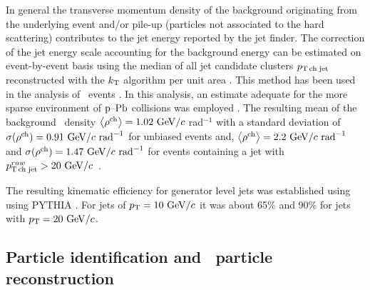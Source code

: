 In general the transverse momentum density of the background originating from the underlying event and/or pile-up (particles not associated to the hard scattering) contributes to the jet energy reported by the jet finder. 
The correction of the jet energy scale accounting for the background energy can be estimated on event-by-event basis using the median of all jet candidate clusters $p_\mathrm{T\,ch\;jet}$ reconstructed with the $k_{\textnormal{T}}$ algorithm per unit area \cite{Cacciari:2008gn}. 
This method has been used in the analysis of \PbPb\ events \cite{Abelev:2013kqa,Adam:2015ewa}.
In this analysis, an estimate adequate for the more sparse environment of $\mbox{p--Pb}$ collisions was employed \cite{Adam:2015hoa}. The resulting mean of the background \pt\ density $\avg{\rho^{\rm ch}}=1.02~\GeVc\ $rad$^{-1}$ with a standard deviation of $\sigma(\rho^{\rm ch})=0.91~\mathrm{GeV}/c~{\mathrm{rad}}^{-1}$ for unbiased events and, $\left\langle\rho^{\rm ch}\right\rangle=2.2~\mathrm{GeV}/c~{\mathrm{rad}}^{-1}$ and $\sigma(\rho^{\mathrm{ch}})=1.47~\mathrm{GeV}/c~{\mathrm{rad}}^{-1}$ for events containing a jet with $p_\mathrm{T\,ch\;jet}^{raw}>20~\mathrm{GeV}/c$~\cite{Adam:2015hoa}.



The resulting kinematic efficiency for generator level jets was established using using PYTHIA \cite{PYTHIA}. For jets of $p_{\mathrm{T}}=10~\mathrm{GeV}/c$ it was about 65\% and 90\% for jets with $p_{\mathrm{T}} =20~\mathrm{GeV}/c$. 

\subsection{Particle identification and \Vzero\ particle reconstruction}

